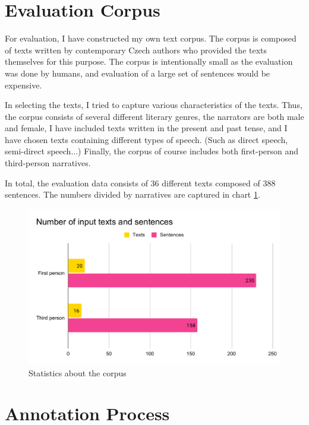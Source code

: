 
\section{Evaluation Corpus}

For evaluation, I have constructed my own text corpus. The corpus is composed of texts written by contemporary Czech authors who provided the texts themselves for this purpose. The corpus is intentionally small as the evaluation was done by humans, and evaluation of a large set of sentences would be expensive.

In selecting the texts, I tried to capture various characteristics of the texts. Thus, the corpus consists of several different literary genres, the narrators are both male and female, I have included texts written in the present and past tense, and I have chosen texts containing different types of speech. (Such as direct speech, semi-direct speech...) Finally, the corpus of course includes both first-person and third-person narratives.

In total, the evaluation data consists of 36 different texts composed of 388 sentences. The numbers divided by narratives are captured in chart \ref{fig:eval-input-numbers}.

\begin{figure}[!ht]
\includegraphics[width=\textwidth]{data/Eval-Input-Numbers.pdf}
\caption{Statistics about the corpus}
\label{fig:eval-input-numbers}
\end{figure}

\section{Annotation Process}

